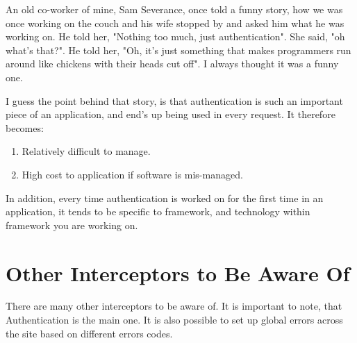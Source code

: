 An old co-worker of mine, Sam Severance, once told a funny story, how we was
once working on the couch and his wife stopped by and asked him what he was 
working on. He told her, "Nothing too much, just authentication". She said, "oh
what's that?". He told her, "Oh, it's just something that makes programmers run
around like chickens with their heads cut off". I always thought it was a funny
one. 

I guess the point behind that story, is that authentication is such an 
important piece of an application, and end's up being used in every request. It
therefore becomes: 
\begin{enumerate}
  \item Relatively difficult to manage.
  \item High cost to application if software is mis-managed. 
\end{enumerate}

In addition, every time authentication is worked on for the first time in an 
application, it tends to be specific to framework, and technology within 
framework you are working on. 

\section{Other Interceptors to Be Aware Of}
There are many other interceptors to be aware of. It is important to note, that
Authentication is the main one. It is also possible to set up global errors 
across the site based on different errors codes.

